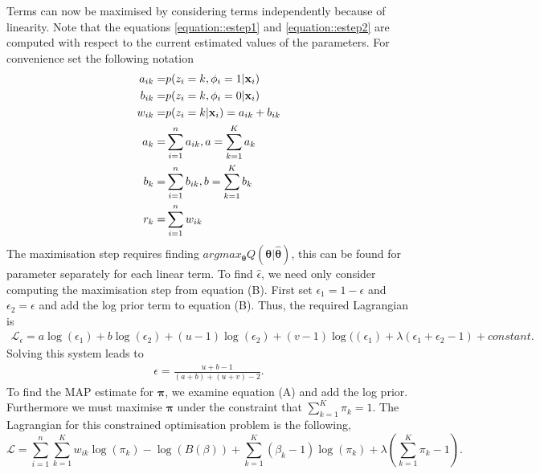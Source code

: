 \documentclass[12pt,english]{article}
\begin{document}
Terms can now be maximised by considering terms independently because of linearity. Note that the equations \ref{equation::estep1} and \ref{equation::estep2} are computed with respect to the current estimated values of the parameters. For convenience set the following notation
\begin{equation}\label{equation::estepfinalapp}
\begin{split}
a_{ik} = & p(z_i = k, \phi_i = 1|{\bf x}_i)\\
b_{ik} = & p(z_i = k, \phi_i = 0|{\bf x}_i) \\
w_{ik} = & p(z_i = k|{\bf x}_i) = a_{ik} + b_{ik}\\
a_k = & \sum_{i=1}^{n}a_{ik}, a = \sum_{k=1}^{K}a_k \\
b_k = & \sum_{i=1}^{n}b_{ik}, b = \sum_{k=1}^{K}b_k \\
r_k = & \sum_{i=1}^{n}w_{ik}
\end{split}
\end{equation}
The maximisation step requires finding $argmax_{\boldsymbol{\theta}}Q(\boldsymbol{\theta}|\boldsymbol{\hat{\theta}})$, this can be found for parameter separately for each linear term. To find $\hat{\epsilon}$, we need only consider computing the maximisation step from equation (B). First set $\epsilon_1 = 1 - \epsilon$ and $\epsilon_2 = \epsilon$ and add the log prior term to equation (B). Thus, the required Lagrangian is
\begin{equation}
\begin{split}
\mathcal{L}_{\epsilon} = a\log(\epsilon_1) + b\log(\epsilon_2) + (u-1)\log(\epsilon_2) + (v-1)\log((\epsilon_1) + \lambda(\epsilon_1 + \epsilon_2 - 1) +  constant.
\end{split}
\end{equation}
Solving this system leads to
\begin{equation}
\begin{split}
\epsilon = \frac{ u + b - 1}{(a+b) + (u+v) - 2}.
\end{split}
\end{equation}
To find the MAP estimate for $\boldsymbol{\pi}$, we examine equation (A) and add the log prior.
Furthermore we must maximise $\boldsymbol{\pi}$ under the constraint that $\sum_{k=1}^{K}\pi_k = 1$. The Lagrangian for this constrained optimisation problem is the following,
\begin{equation}
\mathcal{L}= \sum_{i=1}^{n}\sum_{k=1}^{K}w_{ik}\log(\pi_k) - \log(B(\beta)) + \sum_{k=1}^{K}(\beta_k - 1)\log(\pi_k) + \lambda\left(\sum_{k=1}^{K}\pi_k-1\right).
\end{equation}
\end{document}
